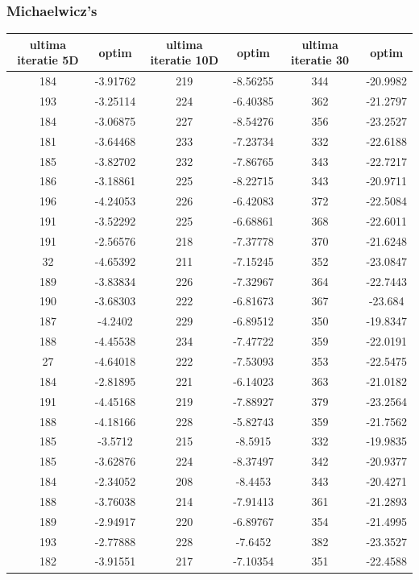 \documentclass{article}
\begin{document}
\subsubsection{Michaelwicz’s}
\begin{tabular}{cccccc}
\hline
ultima iteratie 5D& optim&ultima iteratie 10D& optim&ultima iteratie 30&optim\\
\hline
184&-3.91762&219&-8.56255&344&-20.9982 \\ \hline
193&-3.25114&224&-6.40385&362&-21.2797 \\ \hline
184&-3.06875&227&-8.54276&356&-23.2527 \\ \hline
181&-3.64468&233&-7.23734&332&-22.6188 \\ \hline
185&-3.82702&232&-7.86765&343&-22.7217 \\ \hline
186&-3.18861&225&-8.22715&343&-20.9711 \\ \hline
196&-4.24053&226&-6.42083&372&-22.5084 \\ \hline
191&-3.52292&225&-6.68861&368&-22.6011 \\ \hline
191&-2.56576&218&-7.37778&370&-21.6248 \\ \hline
32&-4.65392&211&-7.15245&352&-23.0847 \\ \hline
189&-3.83834&226&-7.32967&364&-22.7443 \\ \hline
190&-3.68303&222&-6.81673&367&-23.684 \\ \hline
187&-4.2402&229&-6.89512&350&-19.8347 \\ \hline
188&-4.45538&234&-7.47722&359&-22.0191 \\ \hline
27&-4.64018&222&-7.53093&353&-22.5475 \\ \hline
184&-2.81895&221&-6.14023&363&-21.0182 \\ \hline
191&-4.45168&219&-7.88927&379&-23.2564 \\ \hline
188&-4.18166&228&-5.82743&359&-21.7562 \\ \hline
185&-3.5712&215&-8.5915&332&-19.9835 \\ \hline
185&-3.62876&224&-8.37497&342&-20.9377 \\ \hline
184&-2.34052&208&-8.4453&343&-20.4271 \\ \hline
188&-3.76038&214&-7.91413&361&-21.2893 \\ \hline
189&-2.94917&220&-6.89767&354&-21.4995 \\ \hline
193&-2.77888&228&-7.6452&382&-23.3527 \\ \hline
182&-3.91551&217&-7.10354&351&-22.4588 \\ \hline

\end{tabular}
\end{document}
